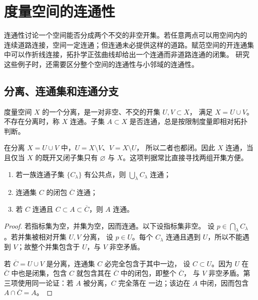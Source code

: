 \chapter{度量空间的连通性}
\label{chap:metric-connectedness}

连通性讨论一个空间能否分成两个不交的非空开集。若任意两点可以用空间内的
连续道路连接，空间一定连通；但连通未必提供这样的道路。赋范空间的开连通集
中可以作折线连接，拓扑学正弦曲线却给出一个连通而非道路连通的闭集。
研究这些例子时，还需要区分整个空间的连通性与小邻域的连通性。

\section{分离、连通集和连通分支}

\begin{definition}[分离与连通]
度量空间 \(X\) 的一个分离，是一对非空、不交的开集 \(U,V\subset X\)，
满足 \(X=U\cup V\)。不存在分离时，称 \(X\) 连通。子集
\(A\subset X\) 是否连通，总是按限制度量即相对拓扑判断。
\end{definition}

在分离 \(X=U\cup V\) 中，\(U=X\setminus V\)、\(V=X\setminus U\)，
所以二者也都闭。因此 \(X\) 连通，当且仅当 \(X\) 的既开又闭子集只有
\(\varnothing\) 与 \(X\)。这项判据常比直接寻找两组开集方便。

\begin{proposition}[连通集的并与闭包]
\label{prop:connected-union-closure}
\begin{enumerate}[label=\textup{(\roman*)}]
 \item 若一族连通子集 \(\{C_\lambda\}\) 有公共点，则
 \(\bigcup_\lambda C_\lambda\) 连通；
 \item 连通集 \(C\) 的闭包 \(\overline C\) 连通；
 \item 若 \(C\) 连通且 \(C\subset A\subset\overline C\)，则 \(A\) 连通。
\end{enumerate}
\end{proposition}

\begin{proof}
若指标集为空，并集为空，因而连通。以下设指标集非空。
设 \(p\in\bigcap_\lambda C_\lambda\)。若并集被相对开集 \(U,V\) 分离，
设 \(p\in U\)。每个 \(C_\lambda\) 连通且遇到 \(U\)，所以不能遇到
\(V\)；故整个并集包含于 \(U\)，与 \(V\) 非空矛盾。

若 \(\overline C=U\cup V\) 是分离，连通集 \(C\) 必完全包含于其中一边，
设 \(C\subset U\)。因为 \(U\) 在 \(\overline C\) 中也是闭集，包含
\(C\) 就包含其在 \(\overline C\) 中的闭包，即整个 \(\overline C\)，
与 \(V\) 非空矛盾。第三项使用同一论证：若 \(A\) 被分离，\(C\) 完全落在
一边；该边在 \(A\) 中闭，因而包含 \(A\cap\overline C=A\)。
\end{proof}


